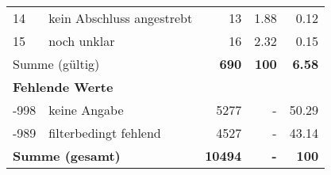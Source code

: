 \begin{longtable}{lXrrr}
     14 &
     \multicolumn{1}{X}{ kein Abschluss angestrebt   } &


       \num{13} &
       \num[round-mode=places,round-precision=2]{1.88} &
         \num[round-mode=places,round-precision=2]{0.12} \\

     15 &
     \multicolumn{1}{X}{ noch unklar   } &


       \num{16} &
       \num[round-mode=places,round-precision=2]{2.32} &
         \num[round-mode=places,round-precision=2]{0.15} \\
     \midrule
     \multicolumn{2}{l}{Summe (gültig)} &
       \textbf{\num{690}} &
     \textbf{\num{100}} &
       \textbf{\num[round-mode=places,round-precision=2]{6.58}} \\
     \multicolumn{5}{l}{\textbf{Fehlende Werte}}\\
       -998 &
       keine Angabe &
         \num{5277} &
        - &
         \num[round-mode=places,round-precision=2]{50.29} \\
       -989 &
       filterbedingt fehlend &
         \num{4527} &
        - &
         \num[round-mode=places,round-precision=2]{43.14} \\
     \midrule
     \multicolumn{2}{l}{\textbf{Summe (gesamt)}} &
          \textbf{\num{10494}} &
        \textbf{-} &
        \textbf{\num{100}} \\
     \bottomrule
     \end{longtable}
     
